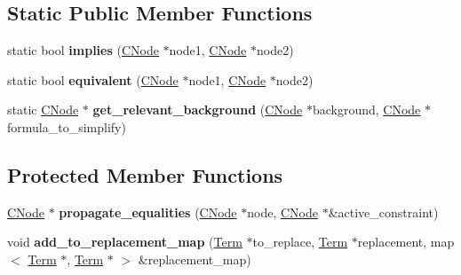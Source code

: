 \subsection*{\-Static \-Public \-Member \-Functions}
\begin{DoxyCompactItemize}
\item 
\hypertarget{classSolver_acf62b72a293cc34ab8c87f17272a8c04}{static bool {\bfseries implies} (\hyperlink{classCNode}{\-C\-Node} $\ast$node1, \hyperlink{classCNode}{\-C\-Node} $\ast$node2)}\label{classSolver_acf62b72a293cc34ab8c87f17272a8c04}

\item 
\hypertarget{classSolver_aa8c6de3271be1d8cd99abafe45202a8f}{static bool {\bfseries equivalent} (\hyperlink{classCNode}{\-C\-Node} $\ast$node1, \hyperlink{classCNode}{\-C\-Node} $\ast$node2)}\label{classSolver_aa8c6de3271be1d8cd99abafe45202a8f}

\item 
\hypertarget{classSolver_ac86336f7c37d7eac95df6d58403e5d65}{static \hyperlink{classCNode}{\-C\-Node} $\ast$ {\bfseries get\-\_\-relevant\-\_\-background} (\hyperlink{classCNode}{\-C\-Node} $\ast$background, \hyperlink{classCNode}{\-C\-Node} $\ast$formula\-\_\-to\-\_\-simplify)}\label{classSolver_ac86336f7c37d7eac95df6d58403e5d65}

\end{DoxyCompactItemize}
\subsection*{\-Protected \-Member \-Functions}
\begin{DoxyCompactItemize}
\item 
\hypertarget{classSolver_ac2d16c892aea8c4e83ec3941ac16fc25}{\hyperlink{classCNode}{\-C\-Node} $\ast$ {\bfseries propagate\-\_\-equalities} (\hyperlink{classCNode}{\-C\-Node} $\ast$node, \hyperlink{classCNode}{\-C\-Node} $\ast$\&active\-\_\-constraint)}\label{classSolver_ac2d16c892aea8c4e83ec3941ac16fc25}

\item 
\hypertarget{classSolver_a71032cd9586a44c6eadd87333661f429}{void {\bfseries add\-\_\-to\-\_\-replacement\-\_\-map} (\hyperlink{classTerm}{\-Term} $\ast$to\-\_\-replace, \hyperlink{classTerm}{\-Term} $\ast$replacement, map$<$ \hyperlink{classTerm}{\-Term} $\ast$, \hyperlink{classTerm}{\-Term} $\ast$ $>$ \&replacement\-\_\-map)}\label{classSolver_a71032cd9586a44c6eadd87333661f429}

\end{DoxyCompactItemize}
